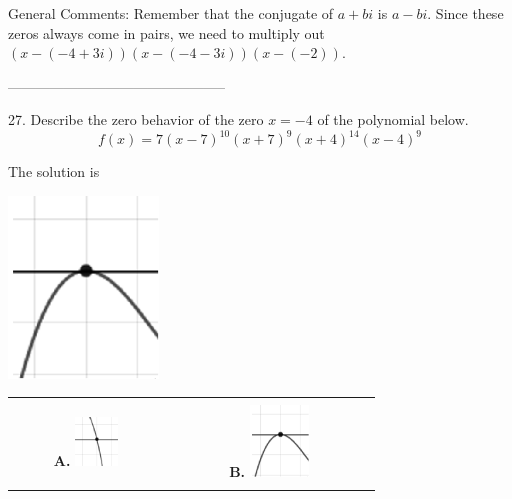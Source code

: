 \documentclass{extbook}[14pt]
\begin{document}
General Comments: Remember that the conjugate of $a+bi$ is $a-bi$. Since these zeros always come in pairs, we need to multiply out $(x-(-4 + 3i))(x-(-4 - 3i))(x-(-2))$.

-----------------------------------------------

27. Describe the zero behavior of the zero $x = -4$ of the polynomial below.
\[ f(x) = 7(x - 7)^{10}(x + 7)^{9}(x + 4)^{14}(x - 4)^{9} \] 

 
 The solution is  
 \begin{center} \includegraphics[width=0.3\textwidth]{../Figures/polyZeroBehaviorBC.png} \end{center}\begin{tabular}{|c|c|} 
\hline 
 & \tabularnewline 
 \textbf{A.} \includegraphics[width=0.3\textwidth]{../Figures/polyZeroBehaviorAC.png} & \textbf{B.} \includegraphics[width=0.3\textwidth]{../Figures/polyZeroBehaviorBC.png} \tabularnewline 
\hline 
 & \tabularnewline 

\end{tabular}
\end{document}

